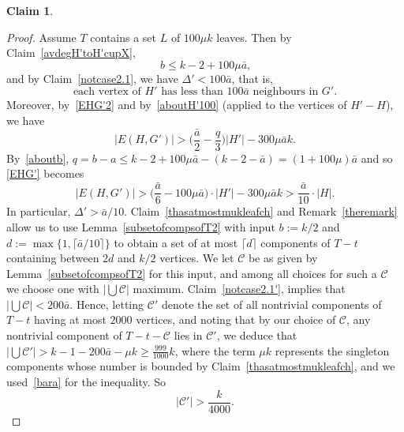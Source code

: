 \documentclass[12pt]{article}
\newtheorem{claim}[theorem]{Claim}
\begin{document}
              \begin{claim}\label{Tatmost200leaves}
          \end{claim}     
          \begin{proof}
          Assume $T$ contains a set $L$ of  $100\mu k$ leaves. Then by
          Claim~\ref{avdegH'toH'cupX},  
          \begin{equation}\label{aboutb}
            \text{$b\le k-2+100 \mu \bar a$,}
         \end{equation}
         and by
         Claim~\ref{notcase2.1}, we have $\Delta'< 100\bar a$, that is,
              \begin{equation}\label{aboutH'100}
        \text{each vertex  of $H'$ has less than $100\bar a$ neighbours in $G'$.}
         \end{equation}
         Moreover, by~\eqref{EHG'2}
    and by~\eqref{aboutH'100} (applied to the vertices of  $H'-H$),  we have   \begin{equation}\label{EHG'}
  |E(H, G')| >  \big(\frac{\bar a}2 -\frac q3\big) |H'| -300 \mu \bar a  k.\end{equation} 
  By~\eqref{aboutb}, 
 $q =b-a\le k-2+100\mu \bar a  -  (k-2-\bar a)= (1+100\mu)\bar a$ and so \eqref{EHG'} becomes 
$$
|E(H, G')| > \big(\frac{\bar a}6 -100\mu\bar a\big)\cdot |H'|  -300 \mu \bar a  k> \frac{\bar a}{10}\cdot |H|.
$$ 
In particular, $\Delta'>\bar a/{10}$. 
Claim~\ref{thasatmostmukleafch} and Remark~\ref{theremark} allow us to use Lemma~\ref{subsetofcompsofT2} with input $b:=k/2$ and $d:=\max\{1,\lceil \bar a/{10}\rceil\}$ to obtain a set of at most $\lceil d\rceil$ components of $T-t$ containing between $2d$ and $k/2$ vertices. 
We let $\mathcal C$ be as given by Lemma~\ref{subsetofcompsofT2} for this input, and among all choices for such a $\mathcal C$ we choose one with $|\bigcup\mathcal C|$ maximum.     Claim~\ref{notcase2.1'},    implies  that $|\bigcup\mathcal C|<200\bar a$.
         Hence, letting $\mathcal C'$ denote the set of all nontrivial components of $T-t$ having at most $2000$ vertices, and noting that by our choice of $\mathcal C$, any nontrivial component of $T-t-\mathcal C$ lies in $\mathcal C'$, we deduce that 
 $|\bigcup\mathcal C'|>k-1-200\bar a-\mu k\ge \frac{999}{1000}k$, where the term $\mu k$ represents the singleton components whose number is bounded by Claim~\ref{thasatmostmukleafch}, and we used~\eqref{bara} for the inequality. So 
     \begin{equation}\label{thesmallcomps}
     |\mathcal C'|>\frac k{4000}.
       \end{equation}


\end{proof}
\end{document}
